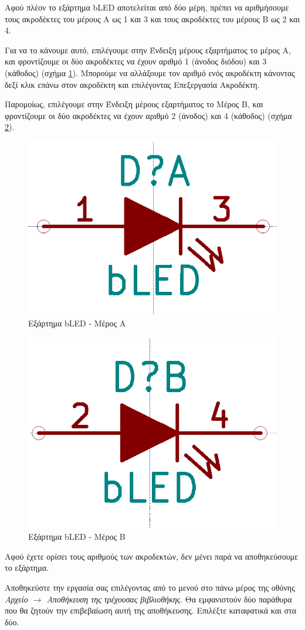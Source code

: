 \documentclass[a4paper]{article}
\begin{document}
Αφού πλέον το εξάρτημα bLED αποτελείται από δύο μέρη, πρέπει να αριθμήσουμε τους ακροδέκτες του μέρους Α ως 1 και 3 και τους ακροδέκτες του μέρους Β ως 2 και 4.

Για να το κάνουμε αυτό, επιλέγουμε στην Ένδειξη μέρους εξαρτήματος το μέρος A, και φροντίζουμε οι δύο ακροδέκτες να έχουν αριθμό 1 (άνοδος διόδου) και 3 (κάθοδος) (σχήμα \ref{fig:libed-circ-bleda}). Μπορούμε να αλλάξουμε τον αριθμό ενός ακροδέκτη κάνοντας δεξί κλικ επάνω στον ακροδέκτη και επιλέγοντας Επεξεργασία Ακροδέκτη.

Παρομοίως, επιλέγουμε στην Ένδειξη μέρους εξαρτήματος το Μέρος B, και φροντίζουμε οι δύο ακροδέκτες να έχουν αριθμό 2 (άνοδος) και 4 (κάθοδος) (σχήμα \ref{fig:libed-circ-bledb}). 

\begin{figure}
  \begin{center}
    \includegraphics[width=.35\textwidth]{img/libed-circ-bleda.png}
    \caption{Εξάρτημα bLED - Μέρος Α}
    \label{fig:libed-circ-bleda}
  \end{center}
\end{figure}

\begin{figure}
  \begin{center}
    \includegraphics[width=.35\textwidth]{img/libed-circ-bledb.png}
    \caption{Εξάρτημα bLED - Μέρος Β}
    \label{fig:libed-circ-bledb}
  \end{center}
\end{figure}

Αφού έχετε ορίσει τους αριθμούς των ακροδεκτών, δεν μένει παρά να αποθηκεύσουμε το εξάρτημα.

Αποθηκεύστε την εργασία σας επιλέγοντας από το μενού στο πάνω μέρος της οθόνης \textit{Αρχείο $\rightarrow$ Αποθήκευση της τρέχουσας βιβλιοθήκης}. Θα εμφανιστούν δύο παράθυρα που θα ζητούν την επιβεβαίωση αυτή της αποθήκευσης. Επιλέξτε καταφατικά και στα δύο.
\end{document}
